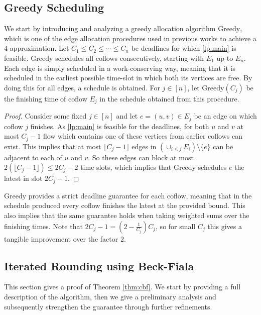 \documentclass[11pt]{article}
\begin{document}
\subsection{Greedy Scheduling}
We start by introducing and analyzing a greedy allocation algorithm $\mathrm{Greedy}$, which is one of the edge allocation procedures used in previous works to achieve a $4$-approximation. Let $C_1 \le C_2 \le \cdots \le C_n$ be deadlines for which \ref{lp:main} is feasible. $\mathrm{Greedy}$ schedules all coflows consecutively, starting with $E_1$ up to $E_n$. Each edge is simply scheduled in a work-conserving way, meaning that it is scheduled in the earliest possible time-slot in which both its vertices are free. By doing this for all edges, a schedule is obtained. For $j \in [n]$, let $\mathrm{Greedy}(C_j)$ be the finishing time of coflow $E_j$ in the schedule obtained from this procedure.

\rslemmagreedy*

\begin{proof}
Consider some fixed $j\in [n]$ and let $e = (u,v) \in E_j$ be an edge on which coflow $j$ finishes. As \ref{lp:main} is feasible for the deadlines, for both $u$ and $v$ at most $C_j - 1$ flow which contains one of these vertices from earlier coflows can exist. This implies that at most $\lfloor C_j-1\rfloor$ edges in $(\cup_{i \le j}E_i)\setminus \{e\}$ can be adjacent to each of $u$ and $v$. So these edges can block at most $2(\lfloor C_j - 1 \rfloor) \le 2C_j -2$ time slots, which implies that $\mathrm{Greedy}$ schedules $e$ the latest in slot $2C_j - 1$.
\end{proof}

$\mathrm{Greedy}$ provides a strict deadline guarantee for each coflow, meaning that in the schedule produced every coflow finishes the latest at the provided bound. This also implies that the same guarantee holds when taking weighted sums over the finishing times. Note that $2C_j - 1 = (2 - \frac{1}{C_j})C_j$, so for small $C_j$ this gives a tangible improvement over the factor $2$.



\subsection{Iterated Rounding using Beck-Fiala} \label{sec:beckfiala}
This section gives a proof of Theorem \ref{thm:cbf}. We start by providing a full description of the algorithm, then we give a preliminary analysis and subsequently strengthen the guarantee through further refinements.
\end{document}
